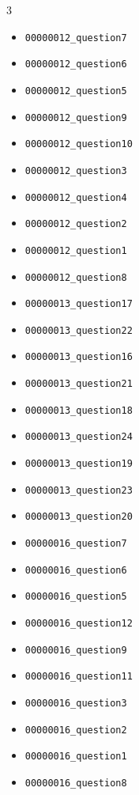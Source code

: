 \begin{multicols}{3}
\begin{itemize}[nosep, leftmargin=*]
        

        \item \texttt{00000012\_question7}
        \item \texttt{00000012\_question6}
        \item \texttt{00000012\_question5}
        \item \texttt{00000012\_question9}
        \item \texttt{00000012\_question10}
        \item \texttt{00000012\_question3}
        \item \texttt{00000012\_question4}
        \item \texttt{00000012\_question2}
        \item \texttt{00000012\_question1}
        \item \texttt{00000012\_question8}
        
        

        \item \texttt{00000013\_question17}
        \item \texttt{00000013\_question22}
        \item \texttt{00000013\_question16}
        \item \texttt{00000013\_question21}
        \item \texttt{00000013\_question18}
        \item \texttt{00000013\_question24}
        \item \texttt{00000013\_question19}
        \item \texttt{00000013\_question23}
        \item \texttt{00000013\_question20}
        
        

        \item \texttt{00000016\_question7}
        \item \texttt{00000016\_question6}
        \item \texttt{00000016\_question5}
        \item \texttt{00000016\_question12}
        \item \texttt{00000016\_question9}
        \item \texttt{00000016\_question11}
        \item \texttt{00000016\_question3}
        \item \texttt{00000016\_question2}
        \item \texttt{00000016\_question1}
        \item \texttt{00000016\_question8}
        

\end{itemize}
\end{multicols}
